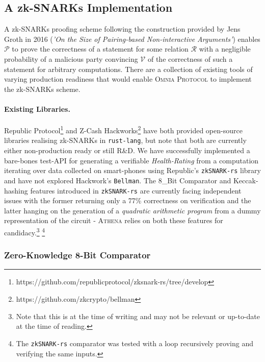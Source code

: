 \documentclass{article}
\begin{document}
		\subsection{A zk-SNARKs Implementation}
		
			A zk-SNARKs proofing scheme following the construction provided by Jens Groth in 2016 (\textit{'On the Size of Pairing-based Non-interactive Arguments'}) enables $\mathcal{P}$ to prove the correctness of a statement for some relation $\mathcal{R}$ with a negligible probability of a malicious party convincing $\mathcal{V}$ of the correctness of such a statement for arbitrary computations. There are a collection of existing tools of varying production readiness that would enable \textsc{Omnia Protocol} to implement the zk-SNARKs scheme.
			
			\paragraph{Existing Libraries.} Republic Protocol\footnote{https://github.com/republicprotocol/zksnark-rs/tree/develop} and Z-Cash Hackworks\footnote{https://github.com/zkcrypto/bellman} have both provided open-source libraries realising zk-SNARKs in \texttt{rust-lang}, but note that both are currently either non-production ready or still R\&D. We have successfully implemented a bare-bones test-API for generating a verifiable \textit{Health-Rating} from a computation iterating over data collected on smart-phones using Republic's \texttt{zkSNARK-rs} library and have not explored Hackwork's \texttt{Bellman}. The 8\_Bit Comparator and Keccak-hashing features introduced in  \texttt{zkSNARK-rs} are currently facing independent issues with the former returning only a 77\% correctness on verification and the latter hanging on the generation of a \textit{quadratic arithmetic program} from a dummy representation of the circuit - \textsc{Athena} relies on both these features for candidacy.\footnote{Note that this is at the time of writing and may not be relevant or up-to-date at the time of reading.} \footnote{The \texttt{zkSNARK-rs} comparator was tested with a loop recursively proving and verifying the same inputs.}
			
			\subsubsection{Zero-Knowledge 8-Bit Comparator}
		
\end{document}

